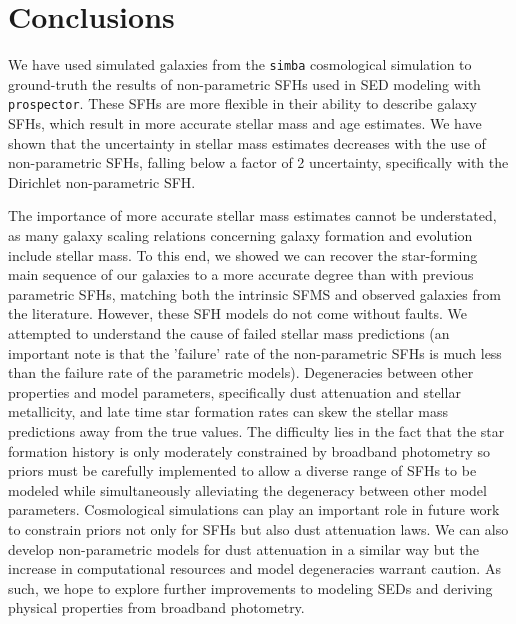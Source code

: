 \documentclass[twocolumn]{aastex62}
\begin{document}
\section{Conclusions}

We have used simulated galaxies from the \texttt{simba} cosmological simulation to ground-truth the results of non-parametric SFHs used in SED modeling with \texttt{prospector}. These SFHs are more flexible in their ability to describe galaxy SFHs, which result in more accurate stellar mass and age estimates. We have shown that the uncertainty in stellar mass estimates decreases with the use of non-parametric SFHs, falling below a factor of 2 uncertainty, specifically with the Dirichlet non-parametric SFH. 

The importance of more accurate stellar mass estimates cannot be understated, as many galaxy scaling relations concerning galaxy formation and evolution include stellar mass. To this end, we showed we can recover the star-forming main sequence of our galaxies to a more accurate degree than with previous parametric SFHs, matching both the intrinsic SFMS and observed galaxies from the literature. However, these SFH models do not come without faults. We attempted to understand the cause of failed stellar mass predictions (an important note is that the 'failure' rate of the non-parametric SFHs is much less than the failure rate of the parametric models). Degeneracies between other properties and model parameters, specifically dust attenuation and stellar metallicity, and late time star formation rates can skew the stellar mass predictions away from the true values. The difficulty lies in the fact that the star formation history is only moderately constrained by broadband photometry so priors must be carefully implemented to allow a diverse range of SFHs to be modeled while simultaneously alleviating the degeneracy between other model parameters. Cosmological simulations can play an important role in future work to constrain priors not only for SFHs but also dust attenuation laws. We can also develop non-parametric models for dust attenuation in a similar way but the increase in computational resources and model degeneracies warrant caution. As such, we hope to explore further improvements to modeling SEDs and deriving physical properties from broadband photometry.  




{}
\end{document}
